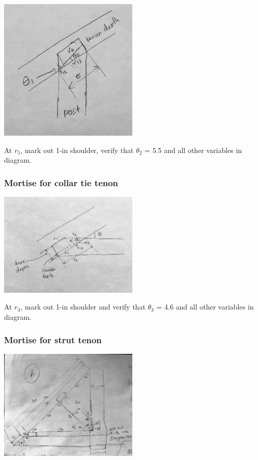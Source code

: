 \documentclass{article}\usepackage[]{graphicx}\usepackage[]{xcolor}
\begin{document}
\begin{center}
	\includegraphics[width=0.5\textwidth]{images/post_tenons_into_rafters}
\end{center}

At $r_5$, mark out 1-in shoulder, verify that $\theta_2$ = 5.5 and all other variables in diagram.

\subsubsection{Mortise for collar tie tenon}

\begin{center}
	\includegraphics[width=0.5\textwidth]{images/collar_tie_tenons_into_rafters}
\end{center}

At $r_3$, mark out 1-in shoulder and verify that $\theta_3$ = 4.6 and all other variables in diagram. 

\subsubsection{Mortise for strut tenon}

\begin{center}
	\includegraphics[width=0.5\textwidth]{images/strut_kp_overall}
\end{center}
\end{document}
